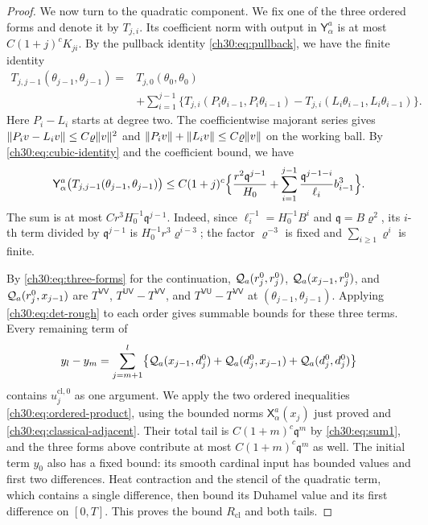 \begin{proof}
We now turn to the quadratic component. We fix one of the three ordered forms and denote it by $T_{j,i}$. Its coefficient norm with output in $\mathsf Y_\alpha^a$ is at most $C(1+j)^cK_{ji}$. By the pullback identity \eqref{ch30:eq:pullback}, we have the finite identity
\begin{equation}\label{ch30:eq:det-ancestor}
 \begin{split}
 T_{j,j-1}(\theta_{j-1},\theta_{j-1})
 ={}&T_{j,0}(\theta_0,\theta_0)\\
 &+\sum_{i=1}^{j-1}\bigl\{T_{j,i}(P_i\theta_{i-1},P_i\theta_{i-1})-T_{j,i}(L_i\theta_{i-1},L_i\theta_{i-1})\bigr\}.
 \end{split}
\end{equation}
Here $P_i-L_i$ starts at degree two. The coefficientwise majorant series gives $\lVert P_iv-L_iv\rVert\le C\varrho\lVert v\rVert^2$ and $\lVert P_iv\rVert+\lVert L_iv\rVert\le C\varrho\lVert v\rVert$ on the working ball. By \eqref{ch30:eq:cubic-identity} and the coefficient bound, we have
\begin{equation}\label{ch30:eq:det-rough}
 \mathsf Y_\alpha^a\bigl(T_{j,j-1}(\theta_{j-1},\theta_{j-1})\bigr)
 \le C(1+j)^c\Bigl\{\frac{r^2\mathfrak q^{j-1}}{H_0}+\sum_{i=1}^{j-1}\frac{\mathfrak q^{j-1-i}}{\ell_i}b_{i-1}^3\Bigr\}.
\end{equation}
The sum is at most $Cr^3H_0^{-1}\mathfrak q^{j-1}$. Indeed, since $\ell_i^{-1}=H_0^{-1}B^i$ and $\mathfrak q=B\varrho^2$, its $i$-th term divided by $\mathfrak q^{j-1}$ is $H_0^{-1}r^3\varrho^{i-3}$; the factor $\varrho^{-3}$ is fixed and $\sum_{i\ge1}\varrho^i$ is finite.

By \eqref{ch30:eq:three-forms} for the continuation, $\mathcal Q_{a}(r_j^0,r_j^0)$, $\mathcal Q_{a}(x_{j-1},r_j^0)$, and $\mathcal Q_{a}(r_j^0,x_{j-1})$ are $T^{\mathsf{VV}}$, $T^{\mathsf{UV}}-T^{\mathsf{VV}}$, and $T^{\mathsf{VU}}-T^{\mathsf{VV}}$ at $(\theta_{j-1},\theta_{j-1})$. Applying \eqref{ch30:eq:det-rough} to each order gives summable bounds for these three terms. Every remaining term of
\[
 y_l-y_m=\sum_{j=m+1}^l\bigl\{\mathcal Q_{a}(x_{j-1},d_j^0)+\mathcal Q_{a}(d_j^0,x_{j-1})+\mathcal Q_{a}(d_j^0,d_j^0)\bigr\}
\]
contains $u_j^{\mathrm{cl},0}$ as one argument. We apply the two ordered inequalities \eqref{ch30:eq:ordered-product}, using the bounded norms $\mathsf X_\alpha^a(x_j)$ just proved and \eqref{ch30:eq:classical-adjacent}. Their total tail is $C(1+m)^c\mathfrak q^m$ by \eqref{ch30:eq:sum1}, and the three forms above contribute at most $C(1+m)^c\mathfrak q^m$ as well. The initial term $y_0$ also has a fixed bound: its smooth cardinal input has bounded values and first two differences. Heat contraction and the stencil of the quadratic term, which contains a single difference, then bound its Duhamel value and its first difference on $[0,T]$. This proves the bound $R_{\mathrm{cl}}$ and both tails.


\end{proof}
